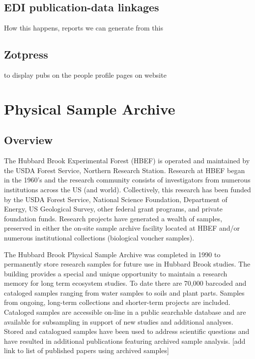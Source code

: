 \documentclass[
  letterpaper,
  DIV=11,
  numbers=noendperiod]{scrreprt}
\begin{document}
\section{EDI publication-data
linkages}\label{edi-publication-data-linkages}

How this happens, reports we can generate from this

\section{Zotpress}\label{zotpress}

to display pubs on the people profile pages on website


\chapter{Physical Sample Archive}\label{physical-sample-archive}

\section{Overview}\label{overview-4}

The Hubbard Brook Experimental Forest (HBEF) is operated and maintained
by the USDA Forest Service, Northern Research Station. Research at HBEF
began in the 1960's and the research community consists of investigators
from numerous institutions across the US (and world). Collectively, this
research has been funded by the USDA Forest Service, National Science
Foundation, Department of Energy, US Geological Survey, other federal
grant programs, and private foundation funds. Research projects have
generated a wealth of samples, preserved in either the on-site sample
archive facility located at HBEF and/or numerous institutional
collections (biological voucher samples).

The Hubbard Brook Physical Sample Archive was completed in 1990 to
permanently store research samples for future use in Hubbard Brook
studies. The building provides a special and unique opportunity to
maintain a research memory for long term ecosystem studies. To date
there are 70,000 barcoded and cataloged samples ranging from water
samples to soils and plant parts. Samples from ongoing, long-term
collections and shorter-term projects are included. Cataloged samples
are accessible on-line in a public searchable database and are available
for subsampling in support of new studies and additional analyses.
Stored and catalogued samples have been used to address scientific
questions and have resulted in additional publications featuring
archived sample analysis. {[}add link to list of published papers using
archived samples{]}
\end{document}
